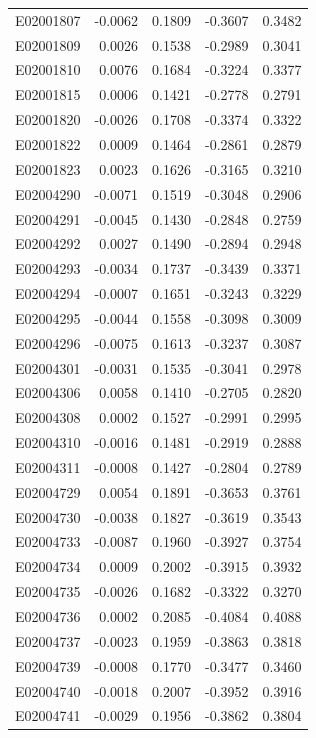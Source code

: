 \documentclass[11pt, a4paper]{article}
\begin{document}
\begin{longtable}{lrrrr}
E02001807 & -0.0062 & 0.1809 & -0.3607 & 0.3482 \\
E02001809 & 0.0026 & 0.1538 & -0.2989 & 0.3041 \\
E02001810 & 0.0076 & 0.1684 & -0.3224 & 0.3377 \\
E02001815 & 0.0006 & 0.1421 & -0.2778 & 0.2791 \\
E02001820 & -0.0026 & 0.1708 & -0.3374 & 0.3322 \\
E02001822 & 0.0009 & 0.1464 & -0.2861 & 0.2879 \\
E02001823 & 0.0023 & 0.1626 & -0.3165 & 0.3210 \\
E02004290 & -0.0071 & 0.1519 & -0.3048 & 0.2906 \\
E02004291 & -0.0045 & 0.1430 & -0.2848 & 0.2759 \\
E02004292 & 0.0027 & 0.1490 & -0.2894 & 0.2948 \\
E02004293 & -0.0034 & 0.1737 & -0.3439 & 0.3371 \\
E02004294 & -0.0007 & 0.1651 & -0.3243 & 0.3229 \\
E02004295 & -0.0044 & 0.1558 & -0.3098 & 0.3009 \\
E02004296 & -0.0075 & 0.1613 & -0.3237 & 0.3087 \\
E02004301 & -0.0031 & 0.1535 & -0.3041 & 0.2978 \\
E02004306 & 0.0058 & 0.1410 & -0.2705 & 0.2820 \\
E02004308 & 0.0002 & 0.1527 & -0.2991 & 0.2995 \\
E02004310 & -0.0016 & 0.1481 & -0.2919 & 0.2888 \\
E02004311 & -0.0008 & 0.1427 & -0.2804 & 0.2789 \\
E02004729 & 0.0054 & 0.1891 & -0.3653 & 0.3761 \\
E02004730 & -0.0038 & 0.1827 & -0.3619 & 0.3543 \\
E02004733 & -0.0087 & 0.1960 & -0.3927 & 0.3754 \\
E02004734 & 0.0009 & 0.2002 & -0.3915 & 0.3932 \\
E02004735 & -0.0026 & 0.1682 & -0.3322 & 0.3270 \\
E02004736 & 0.0002 & 0.2085 & -0.4084 & 0.4088 \\
E02004737 & -0.0023 & 0.1959 & -0.3863 & 0.3818 \\
E02004739 & -0.0008 & 0.1770 & -0.3477 & 0.3460 \\
E02004740 & -0.0018 & 0.2007 & -0.3952 & 0.3916 \\
E02004741 & -0.0029 & 0.1956 & -0.3862 & 0.3804 \\

\end{longtable}
\end{document}
